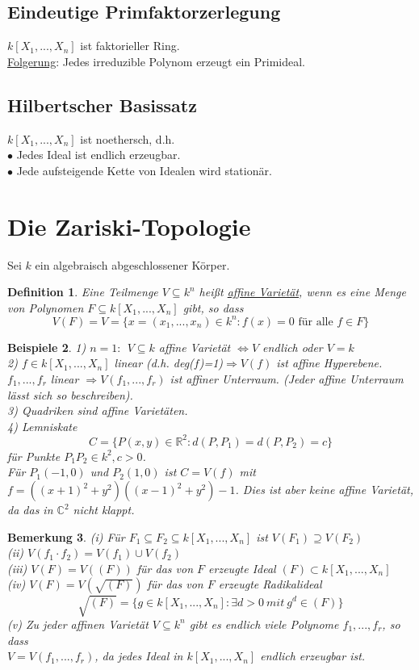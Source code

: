 \documentclass[a4paper,12pt]{report}
\theoremstyle{break}
\newtheorem{Def}{Definition}[chapter]
\newtheorem{Bem}[Def]{Bemerkung}
\newtheorem{Bsp}[Def]{Beispiele}
\theoremstyle{nonumberbreak}
\theoremstyle{nonumberplain}
\begin{document}
\subsection{Eindeutige Primfaktorzerlegung}
$k[X_1,...,X_n]$ ist faktorieller Ring.\\
\underline{Folgerung}: Jedes irreduzible Polynom erzeugt ein Primideal.
\subsection{Hilbertscher Basissatz}
$k[X_1,...,X_n]$ ist noethersch, d.h.\\
$\bullet$ Jedes Ideal ist endlich erzeugbar.\\
$\bullet$ Jede aufsteigende Kette von Idealen wird stationär.
\section{Die Zariski-Topologie}
Sei $k$ ein algebraisch abgeschlossener Körper.
\begin{Def}
Eine Teilmenge $V\subseteq k^n$ heißt \underline{affine Varietät}, wenn es eine Menge von Polynomen $F \subseteq k[X_1,...,X_n]$ gibt, so dass 
$$V(F)=V= \{x= (x_1,...,x_n)\in k^n: f(x)=0 \textrm{~für~alle~} f \in F\}$$
\end{Def}
\begin{Bsp}
1) $n=1:~~V\subseteq k$ affine Varietät $\Leftrightarrow V$ endlich oder $V=k$ \\
2) $f\in k[X_1,...,X_n]$ linear (d.h. deg($f$)=1)$\Rightarrow V(f)$ ist affine Hyperebene.\\
$f_1,...,f_r$ linear $\Rightarrow V(f_1,...,f_r)$ ist affiner Unterraum. (Jeder affine Unterraum lässt sich so beschreiben).\\
3) Quadriken sind affine Varietäten.\\
4) Lemniskate
$$C=\{P(x,y) \in \mathbb{R}^2: d(P,P_1)=d(P,P_2)=c\}$$
für Punkte $P_1P_2\in k^2, c>0$.\\
Für $P_1(-1,0)$ und $P_2(1,0)$ ist $C=V(f)$ mit $f=((x+1)^2+y^2)((x-1)^2+y^2)-1$.
Dies ist aber keine affine Varietät, da das in $\mathbb{C}^2$ nicht klappt.
\end{Bsp}
\begin{Bem}
(i) Für $F_1 \subseteq F_2 \subseteq k[X_1,...,X_n]$ ist $V(F_1)\supseteq V(F_2)$\\
(ii) $V(f_1\cdot f_2)= V(f_1)\cup V(f_2)$\\
(iii) $V(F)=V((F))$ für das von $F$ erzeugte Ideal $(F)\subset k[X_1,...,X_n]$\\
(iv) $V(F)=V(\sqrt{(F)})$ für das von $F$ erzeugte Radikalideal
$$\sqrt{(F)}=\{g\in k[X_1,...,X_n]: \exists d>0 ~ mit~ g^d \in (F) \}$$
(v) Zu jeder affinen Varietät $V\subseteq k^n$ gibt es endlich viele Polynome $f_1,...,f_r$, so dass \\ $V=V(f_1,...,f_r)$, da jedes Ideal in $k[X_1,...,X_n]$ endlich erzeugbar ist.
\end{Bem}
\end{document}
